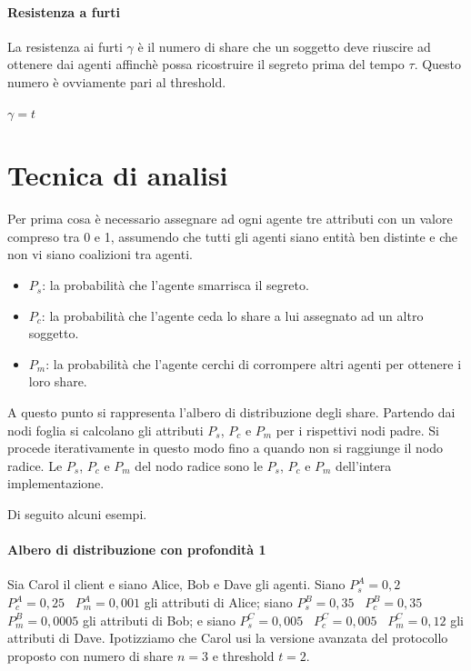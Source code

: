 \paragraph{Resistenza a furti}
La resistenza ai furti $ \gamma $ è il numero di share che un soggetto deve riuscire
ad ottenere dai agenti affinchè possa
ricostruire il segreto prima del tempo $ \tau $.
Questo numero è ovviamente pari al threshold.
\begin{center}
	$ \gamma = t $
\end{center}


\section{Tecnica di analisi}
Per prima cosa è necessario assegnare ad ogni agente tre attributi con un valore
compreso tra 0 e 1, assumendo che tutti gli agenti siano entità ben distinte e
che non vi siano coalizioni tra agenti.

\begin{itemize}
	\item $ P_s $: la probabilità
	      che l'agente smarrisca il segreto.
	\item $ P_c $: la probabilità che l'agente ceda
	      lo share a lui assegnato ad un altro soggetto.
	\item $ P_m $: la probabilità che l'agente cerchi di
	      corrompere altri agenti per ottenere i loro share.
\end{itemize}

A questo punto si rappresenta l'albero di distribuzione degli share.
Partendo dai nodi foglia si calcolano gli attributi $ P_s $, $ P_c $ e $ P_m $
per i rispettivi nodi padre. Si procede iterativamente in questo modo
fino a quando non si raggiunge il nodo radice. Le $ P_s $, $ P_c $ e $ P_m $
del nodo radice sono le $ P_s $, $ P_c $ e $ P_m $ dell'intera implementazione.

Di seguito alcuni esempi.

\paragraph{Albero di distribuzione con profondità 1}
Sia Carol il client e siano Alice, Bob e Dave gli agenti.
Siano
$ P_s^A = 0,2 $ \,
$ P_c^A = 0,25 $ \,
$ P_m^A = 0,001 $
gli attributi di Alice;
siano
$ P_s^B = 0,35 $ \,
$ P_c^B = 0,35 $ \,
$ P_m^B = 0,0005 $
gli attributi di Bob;
e siano
$ P_s^C = 0,005 $ \,
$ P_c^C = 0,005 $ \,
$ P_m^C = 0,12 $
gli attributi di Dave.
Ipotizziamo che Carol usi la versione avanzata del protocollo
proposto con numero di share $ n = 3 $ e threshold $ t = 2 $.


